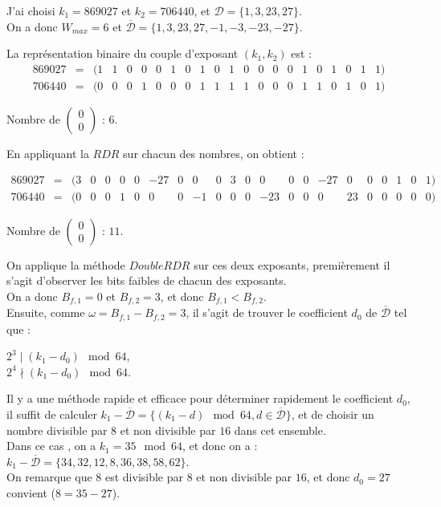 \documentclass[12pt, a4paper]{memoir}
\newcommand{\doublezero}{\begin{pmatrix} 0 \\ 0 \end{pmatrix}}
\newcommand{\dbarre}{\overline{\mathcal{D}}}
\begin{document}
J'ai choisi $k_1 = 869027$ et $k_2 = 706440$, et $\mathcal{D} = \{1,3,23,27\}$. \\
On a donc $W_{max} = 6$ et $\dbarre = \{1,3,23,27,-1,-3,-23,-27\}$.

La représentation binaire du couple d'exposant $(k_1,k_2)$ est :
$$\begin{array}{cccccccccccccccccccccc}
  869027 & = & (1 & 1 & 0 & 0 & 0 & 1 & 0 & 1 & 0 & 1 & 0 & 0 & 0 & 0 & 1 & 0 & 1 & 0 & 1 & 1) \\
  706440 & = & (0 & 0 & 0 & 1 & 0 & 0 & 0 & 1 & 1 & 1 & 1 & 0 & 0 & 0 & 1 & 1 & 0 & 1 & 0 & 1)
 \end{array}$$
 
 Nombre de $\doublezero$ : $6$.

 En appliquant la $RDR$ sur chacun des nombres, on obtient :
 
 $$\begin{array}{ccccccccccccccccccccccc}
  869027 & = & (3 & 0 & 0 & 0 & 0 & -27 & 0 & 0 & 0 & 3 & 0 & 0 & 0 & 0 & -27 & 0 & 0 & 0 & 1 & 0 & 1) \\
  706440 & = & (0 & 0 & 0 & 1 & 0 & 0 & 0 & -1 & 0 & 0 & 0 & -23 & 0 & 0 & 0 & 23 & 0 & 0 & 0 & 0 & 0)
 \end{array}$$

 Nombre de $\doublezero$ : $11$.
 
On applique la méthode $DoubleRDR$ sur ces deux exposants, premièrement il s'agit d'observer les bits faibles de chacun 
des exposants. \\
On a donc $B_{f,1} = 0$ et $B_{f,2} = 3$, et donc $B_{f,1} < B_{f,2}$. \\
Ensuite, comme $\omega = B_{f,1} - B_{f,2} = 3$, il s'agit de trouver le coefficient $d_0$ de $\dbarre$ tel que :
   \begin{center}
    $2^{3} \mid (k_1 - d_0) \mod 64$, \\
    $2^{4} \nmid (k_1 - d_0) \mod 64$.
   \end{center}

   Il y a une méthode rapide et efficace pour déterminer rapidement le coefficient $d_0$, il suffit de calculer
   $k_1 - \dbarre = \{(k_1 - d) \mod 64, d \in \dbarre\}$, et de choisir un nombre divisible par $8$ et non 
   divisible par $16$ dans cet ensemble. \\
   Dans ce cas , on a $k_1 = 35 \mod 64$, et donc on a : \\
 $k_1 - \dbarre = \{34,32,12,8,36,38,58,62\}$. \\
 On remarque que $8$ est divisible par $8$ et non divisible par $16$, et donc $d_0 = 27$ convient ($8 = 35-27$).
 
\end{document}
